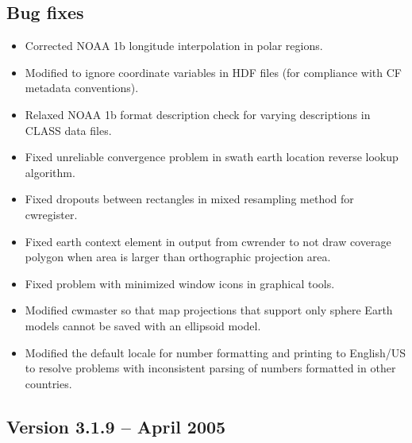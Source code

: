 \subsection*{Bug fixes}
\begin{itemize}

  \item Corrected NOAA 1b longitude interpolation in polar regions.

  \item Modified to ignore coordinate variables in HDF files (for
  compliance with CF metadata conventions).

  \item Relaxed NOAA 1b format description check for varying
  descriptions in CLASS data files.

  \item Fixed unreliable convergence problem in swath earth location
  reverse lookup algorithm.

  \item Fixed dropouts between rectangles in mixed resampling method
  for cwregister.

  \item Fixed earth context element in output from cwrender to not
  draw coverage polygon when area is larger than orthographic
  projection area.

  \item Fixed problem with minimized window icons in graphical tools.

  \item Modified cwmaster so that map projections that support only
  sphere Earth models cannot be saved with an ellipsoid model.

  \item Modified the default locale for number formatting and printing
  to English/US to resolve problems with inconsistent parsing of
  numbers formatted in other countries.

\end{itemize}


\subsection*{Version 3.1.9 -- April 2005}

